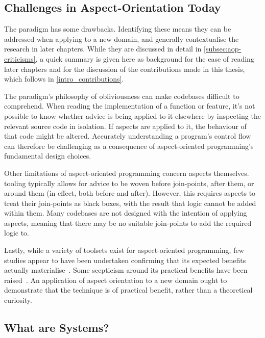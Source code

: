 \subsection{Challenges in Aspect-Orientation Today}

The \aspectoriented{} paradigm has some drawbacks. Identifying these means they
can be addressed when applying \aop{} to a new domain, and generally
contextualise the research in later chapters. While they are discussed in detail
in \cref{subsec:aop-criticisms}, a quick summary is given here as background for
the ease of reading later chapters and for the discussion of the contributions
made in this thesis, which follows in \cref{intro_contributions}.

The paradigm's philosophy of obliviousness can make codebases difficult to
comprehend. When reading the implementation of a function or feature, it's not
possible to know whether advice is being applied to it elsewhere by inspecting
the relevant source code in isolation. If aspects are applied to it, the
behaviour of that code might be altered. Accurately understanding a program's
control flow can therefore be challenging as a consequence of aspect-oriented
programming's fundamental design choices.

Other limitations of aspect-oriented programming concern aspects themselves.
\Aspectorientation{} tooling typically allows for advice to be woven before
join-points, after them, or around them (in effect, both before and after).
However, this requires aspects to treat their join-points as black boxes, with
the result that logic cannot be added within them. Many codebases are not
designed with the intention of applying aspects, meaning that there may be no
suitable join-points to add the required logic to.

Lastly, while a variety of toolsets exist for aspect-oriented programming, few
studies appear to have been undertaken confirming that its expected benefits
actually materialise~\cite{przybylek2018empirical}. Some scepticism around its
practical benefits have been
raised~\cite{steimann06paradoxical,przybylek2010wrong,Constantinides04aopconsidered}.
An application of aspect orientation to a new domain ought to demonstrate that
the technique is of practical benefit, rather than a theoretical curiosity.



\subsection{What are \SocioTechnical Systems?}

